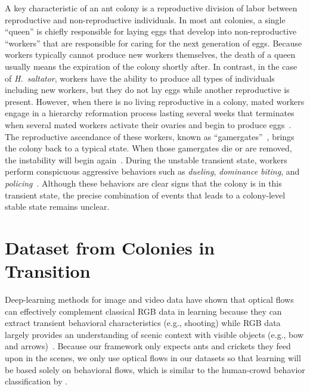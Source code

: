 \documentclass[letterpaper]{article} %
\begin{document}
A key characteristic of an ant colony is a reproductive division of 
labor between reproductive and non-reproductive individuals. 
In most ant colonies, a single ``queen'' is chiefly responsible for 
laying eggs that develop into non-reproductive ``workers'' that 
are responsible for caring for the next generation of eggs. 
Because workers typically cannot produce
new workers themselves, the death of a queen usually means the
expiration of the colony shortly after. 
In contrast, in the case of \emph{H.~saltator}, workers
have the ability to produce all types of individuals including new
workers,
but they do not lay eggs while another
reproductive is present. However, when there is no living reproductive
in a colony, mated workers engage in a hierarchy reformation process 
lasting several weeks that terminates when several mated workers activate
their ovaries and begin to produce eggs~\citep{LPH99, SPSHPL16}. The
reproductive ascendance of these workers, known as 
``gamergates''~\citep{PC85}, brings the colony back to a typical state. 
When those gamergates die or are removed, the instability will begin 
again~\citep{LPH99, SPSHPL16}. 
During the unstable transient state, workers perform conspicuous aggressive
behaviors such as \emph{dueling}, \emph{dominance biting}, and 
\emph{policing}~\citep{SPSHPL16}. 
Although these behaviors are clear signs that the colony is in 
this transient state, the precise combination of events that 
leads to a colony-level stable state remains unclear.



\section{Dataset from Colonies in Transition}
\label{sec:dataset}

Deep-learning methods for image and video data have shown that optical
flows can effectively complement classical RGB data in learning because
they can extract transient behavioral characteristics (e.g., shooting)
while RGB data largely provides an understanding of scenic context with
visible objects (e.g., bow and arrows)~\citep{SZ14}. Because our
framework only expects ants and crickets they feed upon in
the scenes, we only use optical flows in our datasets so that learning
will be based solely on behavioral flows, which is similar to
the human-crowd behavior classification by \citet{MOS09}.
\end{document}
